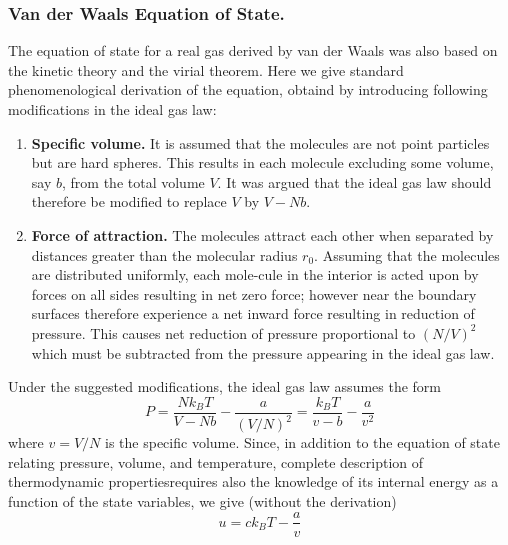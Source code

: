 \documentclass[../../../Main.tex]{subfiles}
\begin{document}
\subsubsection*{Van der Waals Equation of State.} The equation of state for a real gas derived by van der Waals was also based on the kinetic theory and the virial theorem. Here we give standard phenomenological derivation of the equation, obtaind by introducing following modifications in the ideal gas law:
\begin{enumerate}
    \item \textbf{Specific volume.} It is assumed that the molecules are not point particles but are hard spheres. This results in each molecule excluding some volume, say $b$, from the total volume $V$. It was argued that the ideal gas law should therefore be modified to replace $V$ by $V - N b$.
    \item \textbf{Force of attraction.} The molecules attract each other when separated by distances greater than the molecular radius $r_0$. Assuming that the molecules are distributed uniformly, each mole-cule in the interior is acted upon by forces on all sides resulting in net zero force; however near the boundary surfaces therefore experience a net inward force resulting in reduction of pressure. This causes net reduction of pressure proportional to $(N /V )^2$ which must be subtracted from the pressure appearing in the ideal gas law.
\end{enumerate}
Under the suggested modifications, the ideal gas law assumes the form
\begin{equation*}
    P=\frac{Nk_B T}{V-Nb}-\frac{a}{(V/N)^2}=\frac{k_BT}{v-b}- \frac{a}{v^2}
\end{equation*}
where $v=V/N$ is the specific volume. Since, in addition to the equation of state relating pressure, volume, and temperature, complete description of thermodynamic propertiesrequires also the knowledge of its internal energy as a function of the state variables, we give (without the derivation)
\begin{equation*}
    u=ck_BT-\frac{a}{v}
\end{equation*}
\end{document}
